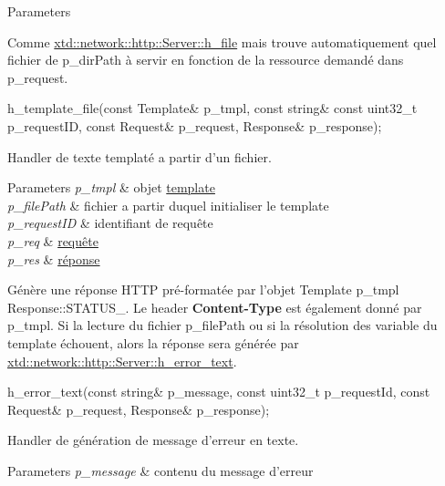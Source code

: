 \begin{DoxyItemize}
\begin{DoxyParams}{Parameters}
\hline
\end{DoxyParams}
Comme \hyperlink{classxtd_1_1network_1_1http_1_1Server_a4358a20d2246a84f67d299f385c5bce8}{xtd\-::network\-::http\-::\-Server\-::h\-\_\-file} mais trouve automatiquement quel fichier de p\-\_\-dir\-Path à servir en fonction de la ressource demandé dans p\-\_\-request.
\item 
\begin{DoxyCode}
h\_template\_file(\textcolor{keyword}{const} Template& p\_tmpl, \textcolor{keyword}{const} \textcolor{keywordtype}{string}& \textcolor{keyword}{const} uint32\_t p\_requestID, \textcolor{keyword}{const} Request& p\_request,
       Response& p\_response); 
\end{DoxyCode}
 Handler de texte templaté a partir d'un fichier. 
\begin{DoxyParams}{Parameters}
{\em p\-\_\-tmpl} & objet \hyperlink{classxtd_1_1network_1_1http_1_1Template}{template} \\
\hline
{\em p\-\_\-file\-Path} & fichier a partir duquel initialiser le template \\
\hline
{\em p\-\_\-request\-I\-D} & identifiant de requête \\
\hline
{\em p\-\_\-req} & \hyperlink{classxtd_1_1network_1_1http_1_1Request}{requête} \\
\hline
{\em p\-\_\-res} & \hyperlink{classxtd_1_1network_1_1http_1_1Response}{réponse}\\
\hline
\end{DoxyParams}
Génère une réponse H\-T\-T\-P pré-\/formatée par l'objet Template p\-\_\-tmpl Response\-::\-S\-T\-A\-T\-U\-S\-\_. Le header {\bfseries Content-\/\-Type} est également donné par p\-\_\-tmpl. Si la lecture du fichier p\-\_\-file\-Path ou si la résolution des variable du template échouent, alors la réponse sera générée par \hyperlink{classxtd_1_1network_1_1http_1_1Server_a39656db929894be1af465c0409c22f35}{xtd\-::network\-::http\-::\-Server\-::h\-\_\-error\-\_\-text}.
\item 
\begin{DoxyCode}
h\_error\_text(\textcolor{keyword}{const} \textcolor{keywordtype}{string}& p\_message, \textcolor{keyword}{const} uint32\_t p\_requestId, \textcolor{keyword}{const} Request& p\_request, Response& 
      p\_response); 
\end{DoxyCode}
 Handler de génération de message d'erreur en texte. 
\begin{DoxyParams}{Parameters}
{\em p\-\_\-message} & contenu du message d'erreur \\

\end{DoxyParams}
\end{DoxyItemize}
